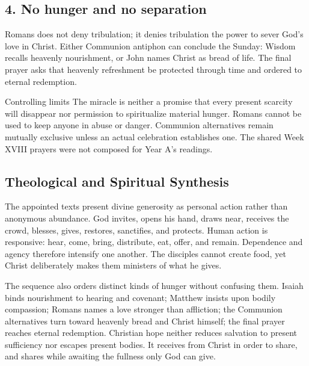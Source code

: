 \subsection*{4. No hunger and no separation\enspace{}}
Romans does not deny tribulation; it denies tribulation the power to sever God's love in Christ. Either Communion antiphon can conclude the Sunday: Wisdom recalls heavenly nourishment, or John names Christ as bread of life. The final prayer asks that heavenly refreshment be protected through time and ordered to eternal redemption.

\begin{studybox}{Controlling limits}
The miracle is neither a promise that every present scarcity will disappear nor permission to spiritualize material hunger. Romans cannot be used to keep anyone in abuse or danger. Communion alternatives remain mutually exclusive unless an actual celebration establishes one. The shared Week XVIII prayers were not composed for Year A's readings.
\end{studybox}

\clearpage
\subsection*{Theological and Spiritual Synthesis}
The appointed texts present divine generosity as personal action rather than anonymous abundance. God invites, opens his hand, draws near, receives the crowd, blesses, gives, restores, sanctifies, and protects. Human action is responsive: hear, come, bring, distribute, eat, offer, and remain. Dependence and agency therefore intensify one another. The disciples cannot create food, yet Christ deliberately makes them ministers of what he gives.

The sequence also orders distinct kinds of hunger without confusing them. Isaiah binds nourishment to hearing and covenant; Matthew insists upon bodily compassion; Romans names a love stronger than affliction; the Communion alternatives turn toward heavenly bread and Christ himself; the final prayer reaches eternal redemption. Christian hope neither reduces salvation to present sufficiency nor escapes present bodies. It receives from Christ in order to share, and shares while awaiting the fullness only God can give.

